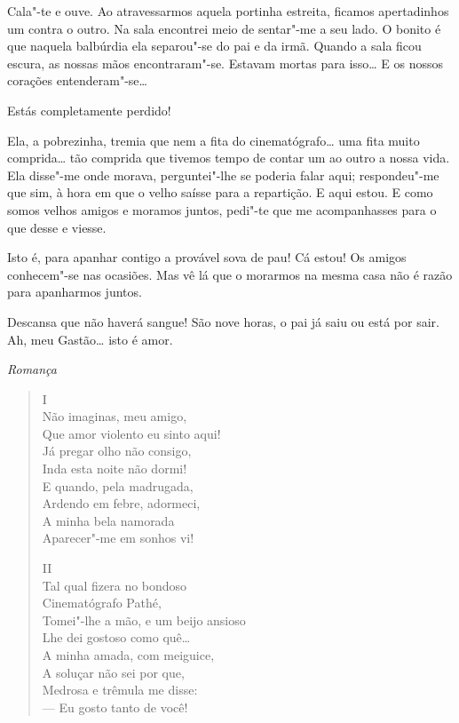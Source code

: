 \begin{linenumbers}
 Cala"-te e ouve. Ao
atravessarmos aquela portinha estreita, ficamos apertadinhos um contra
o outro. Na sala encontrei meio de sentar"-me a seu lado. O bonito
é que naquela balbúrdia ela separou"-se do pai e da
irmã. Quando a sala ficou escura, as nossas
mãos encontraram"-se. Estavam mortas para isso\ldots{} E os
nossos corações entenderam"-se\ldots{}

 Estás completamente perdido!

 Ela, a pobrezinha,
tremia que nem a fita do cinematógrafo\ldots{} uma fita
muito comprida\ldots{} tão comprida que tivemos tempo de
contar um ao outro a nossa vida. Ela disse"-me onde morava,
perguntei"-lhe se poderia falar aqui; respondeu"-me que sim, à
hora em que o velho saísse para a repartição.
E aqui estou. E como somos velhos amigos e moramos juntos,
pedi"-te que me acompanhasses para o que desse e viesse.

 Isto é,
para apanhar contigo a provável sova de pau!
Cá estou! Os amigos conhecem"-se nas
ocasiões. Mas vê lá que o morarmos
na mesma casa não é razão para apanharmos juntos.

 Descansa que
não haverá sangue! 
São nove horas, o pai já saiu ou está por
sair. Ah, meu Gastão\ldots{} isto é amor.

{\smallskip\raggedleft\itshape Romança\par}
\begin{verse}
\hspace{17mm} I\\
\smallskip
Não imaginas, meu amigo,\\
Que amor violento eu sinto aqui!\\
Já pregar olho não consigo, \\
Inda esta noite não dormi! \\
E quando, pela madrugada, \\
Ardendo em febre, adormeci, \\
A minha bela namorada \\
Aparecer"-me em sonhos vi!

\hspace{17mm} II\\
\smallskip
Tal qual fizera no bondoso \\
Cinematógrafo Pathé, \\
Tomei"-lhe a mão, e um beijo ansioso\\
Lhe dei gostoso como quê\ldots{}\\
A minha amada, com meiguice, \\
A soluçar não sei por que, \\
Medrosa e trêmula me disse: \\
--- Eu gosto tanto de você!
\end{verse}




\end{linenumbers}
